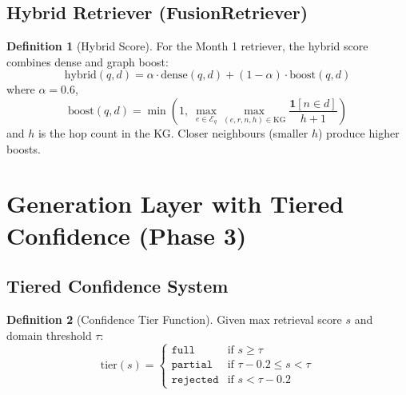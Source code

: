 \documentclass[12pt,a4paper]{article}
\theoremstyle{definition}
\newtheorem{definition}{Definition}[section]
\theoremstyle{plain}
\theoremstyle{remark}
\begin{document}
\subsection{Hybrid Retriever (FusionRetriever)}

\begin{definition}[Hybrid Score]
For the Month 1 retriever, the hybrid score combines dense and graph boost:
\[
  \text{hybrid}(q, d) = \alpha \cdot \text{dense}(q,d) + (1-\alpha)\cdot\text{boost}(q,d)
\]
where $\alpha = 0.6$,
\[
  \text{boost}(q, d) = \min\!\left(1,\; \max_{e \in \mathcal{E}_q}\max_{(e, r, n, h) \in \mathrm{KG}} \frac{\mathbf{1}[n \in d]}{h+1}\right)
\]
and $h$ is the hop count in the KG. Closer neighbours (smaller $h$) produce higher boosts.
\end{definition}

\newpage
\section{Generation Layer with Tiered Confidence (Phase 3)}

\subsection{Tiered Confidence System}

\begin{definition}[Confidence Tier Function]
Given max retrieval score $s$ and domain threshold $\tau$:
\[
  \mathrm{tier}(s) = \begin{cases}
    \texttt{full}     & \text{if } s \ge \tau \\
    \texttt{partial}  & \text{if } \tau - 0.2 \le s < \tau \\
    \texttt{rejected} & \text{if } s < \tau - 0.2
  \end{cases}
\]
\end{definition}
\end{document}

